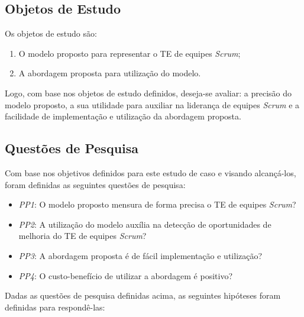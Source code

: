 \subsection{Objetos de Estudo}
\label{estudodecaso:design:objetos}

Os objetos de estudo são:

\begin{enumerate}
  \item O modelo proposto para representar o TE de equipes \textit{Scrum};
  \item A abordagem proposta para utilização do modelo.
\end{enumerate}

Logo, com base nos objetos de estudo definidos, deseja-se avaliar: a precisão do modelo proposto, a sua utilidade para auxiliar na liderança de equipes \textit{Scrum} e a facilidade de implementação e utilização da abordagem proposta.

\subsection{Questões de Pesquisa}
\label{estudodecaso:design:perguntas}

Com base nos objetivos definidos para este estudo de caso e visando alcançá-los, foram definidas as seguintes questões de pesquisa:

\begin{itemize}
  \item \textit{PP1}: O modelo proposto mensura de forma precisa o TE de equipes \textit{Scrum}?
  \item \textit{PP2}: A utilização do modelo auxília na detecção de oportunidades de melhoria do TE de equipes \textit{Scrum}?
  \item \textit{PP3}: A abordagem proposta é de fácil implementação e utilização?
  \item \textit{PP4}: O custo-benefício de utilizar a abordagem é positivo?
\end{itemize}

Dadas as questões de pesquisa definidas acima, as seguintes hipóteses foram definidas para respondê-las:


